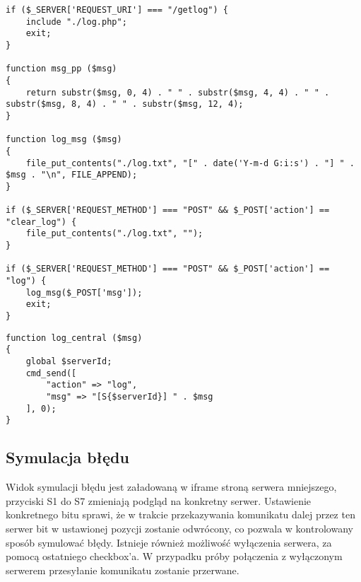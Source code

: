 \newpage
\begin{empty}
	\begin{verbatim}
if ($_SERVER['REQUEST_URI'] === "/getlog") {
	include "./log.php";
	exit;
}

function msg_pp ($msg)
{
	return substr($msg, 0, 4) . " " . substr($msg, 4, 4) . " " . substr($msg, 8, 4) . " " . substr($msg, 12, 4);
}

function log_msg ($msg)
{
	file_put_contents("./log.txt", "[" . date('Y-m-d G:i:s') . "] " . $msg . "\n", FILE_APPEND);
}

if ($_SERVER['REQUEST_METHOD'] === "POST" && $_POST['action'] == "clear_log") {
	file_put_contents("./log.txt", "");
}

if ($_SERVER['REQUEST_METHOD'] === "POST" && $_POST['action'] == "log") {
	log_msg($_POST['msg']);
	exit;
}
	\end{verbatim}
	\vspace{-10pt}
\end{empty}

\begin{empty}
	\begin{verbatim}
function log_central ($msg)
{
	global $serverId;
	cmd_send([
		"action" => "log",
		"msg" => "[S{$serverId}] " . $msg
	], 0);
}
	\end{verbatim}
	\vspace{-10pt}
\end{empty}

\newpage
\subsection{Symulacja błędu}
Widok symulacji błędu jest załadowaną w iframe stroną serwera mniejszego, przyciski S1 do S7 zmieniają podgląd na konkretny serwer. Ustawienie konkretnego bitu sprawi, że w trakcie przekazywania komunikatu dalej przez ten serwer bit w ustawionej pozycji zostanie odwrócony, co pozwala w kontrolowany sposób symulować błędy. Istnieje również możliwość wyłączenia serwera, za pomocą ostatniego checkbox'a. W przypadku próby połączenia z wyłączonym serwerem przesyłanie komunikatu zostanie przerwane.


